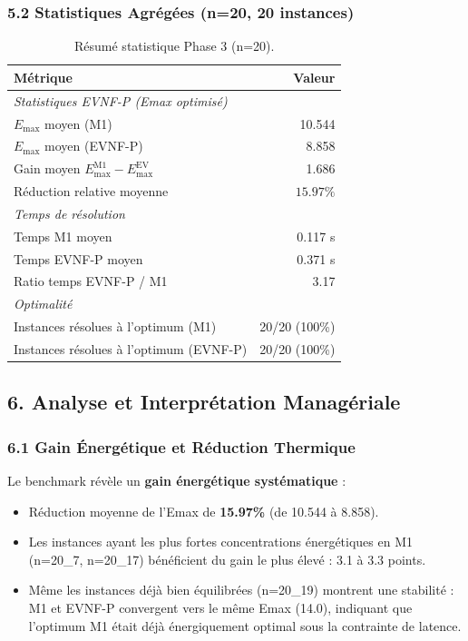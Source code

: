 \documentclass{article}
\begin{document}
\subsubsection{5.2 Statistiques Agrégées (n=20, 20 instances)}

\begin{table}[h!]
\centering
\begin{tabular}{l r}
\toprule
\textbf{Métrique} & \textbf{Valeur} \\
\midrule
\textit{Statistiques EVNF-P (Emax optimisé)} \\
$E_{\max}$ moyen (M1) & 10.544 \\
$E_{\max}$ moyen (EVNF-P) & 8.858 \\
Gain moyen $E_{\max}^{\text{M1}} - E_{\max}^{\text{EV}}$ & 1.686 \\
Réduction relative moyenne & $15.97\%$ \\
\midrule
\textit{Temps de résolution} \\
Temps M1 moyen & 0.117 s \\
Temps EVNF-P moyen & 0.371 s \\
Ratio temps EVNF-P / M1 & 3.17 \\
\midrule
\textit{Optimalité} \\
Instances résolues à l'optimum (M1) & 20/20 (100\%) \\
Instances résolues à l'optimum (EVNF-P) & 20/20 (100\%) \\
\bottomrule
\end{tabular}
\caption{Résumé statistique Phase 3 (n=20).}
\label{tab:phase3_summary}
\end{table}

\subsection{6. Analyse et Interprétation Managériale}

\subsubsection{6.1 Gain Énergétique et Réduction Thermique}

Le benchmark révèle un \textbf{gain énergétique systématique} :
\begin{itemize}
    \item Réduction moyenne de l'Emax de \textbf{15.97\%} (de 10.544 à 8.858).
    \item Les instances ayant les plus fortes concentrations énergétiques en M1 (n=20\_7, n=20\_17) bénéficient du gain le plus élevé : 3.1 à 3.3 points.
    \item Même les instances déjà bien équilibrées (n=20\_19) montrent une stabilité : M1 et EVNF-P convergent vers le même Emax (14.0), indiquant que l'optimum M1 était déjà énergiquement optimal sous la contrainte de latence.
\end{itemize}
\end{document}
